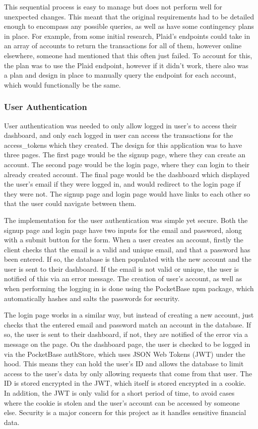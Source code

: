 This sequential process is easy to manage but does not perform well for unexpected changes. This meant that the original requirements had to be detailed enough to encompass any possible queries, as well as have some contingency plans in place. For example, from some initial research, Plaid's endpoints could take in an array of accounts to return the transactions for all of them, however online elsewhere, someone had mentioned that this often just failed. To account for this, the plan was to use the Plaid endpoint, however if it didn't work, there also was a plan and design in place to manually query the endpoint for each account, which would functionally be the same.

\subsubsection{User Authentication}
User authentication was needed to only allow logged in user's to access their dashboard, and only each logged in user can access the transactions for the access\_tokens which they created. The design for this application was to have three pages. The first page would be the signup page, where they can create an account. The second page would be the login page, where they can login to their already created account. The final page would be the dashboard which displayed the user's email if they were logged in, and would redirect to the login page if they were not. The signup page and login page would have links to each other so that the user could navigate between them.

The implementation for the user authentication was simple yet secure. Both the signup page and login page have two inputs for the email and password, along with a submit button for the form. When a user creates an account, firstly the client checks that the email is a valid and unique email, and that a password has been entered. If so, the database is then populated with the new account and the user is sent to their dashboard. If the email is not valid or unique, the user is notified of this via an error message. The creation of user's account, as well as when performing the logging in is done using the PocketBase npm package, which automatically hashes and salts the passwords for security.

The login page works in a similar way, but instead of creating a new account, just checks that the entered email and password match an account in the database. If so, the user is sent to their dashboard, if not, they are notified of the error via a message on the page. On the dashboard page, the user is checked to be logged in via the PocketBase authStore, which uses JSON Web Tokens (JWT) under the hood. This means they can hold the user's ID and allows the database to limit access to the user's data by only allowing requests that come from that user. The ID is stored encrypted in the JWT, which itself is stored encrypted in a cookie. In addition, the JWT is only valid for a short period of time, to avoid cases where the cookie is stolen and the user's account can be accessed by someone else. Security is a major concern for this project as it handles sensitive financial data.

